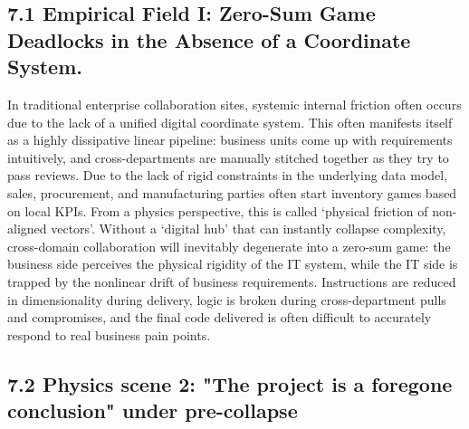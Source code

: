 \documentclass[11pt,a4paper]{article}
\begin{document}
\subsection*{7.1 Empirical Field I: Zero-Sum Game Deadlocks in the Absence of a Coordinate System.}


In traditional enterprise collaboration sites, systemic internal friction often occurs due to the lack of a unified digital coordinate system. This often manifests itself as a highly dissipative linear pipeline: business units come up with requirements intuitively, and cross-departments are manually stitched together as they try to pass reviews. Due to the lack of rigid constraints in the underlying data model, sales, procurement, and manufacturing parties often start inventory games based on local KPIs. From a physics perspective, this is called ‘physical friction of non-aligned vectors’. Without a ‘digital hub’ that can instantly collapse complexity, cross-domain collaboration will inevitably degenerate into a zero-sum game: the business side perceives the physical rigidity of the IT system, while the IT side is trapped by the nonlinear drift of business requirements. Instructions are reduced in dimensionality during delivery, logic is broken during cross-department pulls and compromises, and the final code delivered is often difficult to accurately respond to real business pain points.


\subsection*{7.2 Physics scene 2: "The project is a foregone conclusion" under pre-collapse}
\end{document}
